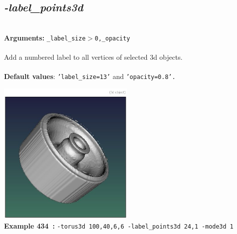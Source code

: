 \documentclass[a4paper,11pt,twoside]{book}
\begin{document}
\subsection{\emph{-label\_points3d} }\vspace*{-0.5em}
~\\\textbf{Arguments: } 
{\small \texttt{\_label\_size$>$0,\_opacity}}\\~\\
Add a numbered label to all vertices of selected 3d objects.
~\\~\\\textbf{Default values}: {\small \texttt{'label\_size=13'} and \texttt{'opacity=0.8'.}}
\begin{center}\includegraphics[keepaspectratio=true,height=7cm,width=\textwidth]{img/gmic_def434.jpg}\\
{\footnotesize \textbf{Example 434~:} \texttt{-torus3d 100,40,6,6 -label\_points3d 24,1 -mode3d 1}}
\end{center}
\end{document}
